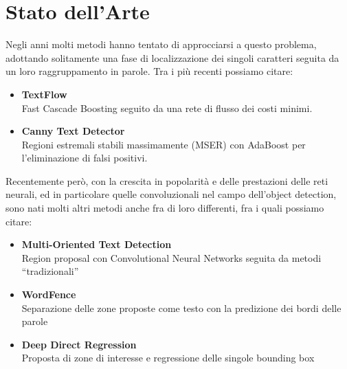 \section{Stato dell'Arte}
\label{sec:sota}
Negli anni molti metodi hanno tentato di approcciarsi a questo problema, adottando solitamente una fase di localizzazione dei singoli caratteri seguita da un loro raggruppamento in parole. Tra i più recenti possiamo citare:
\begin{itemize}
	\item
		\textbf{TextFlow}~\cite{tian2015text} \\
		Fast Cascade Boosting seguito da una rete di flusso dei costi minimi.
	\item
		\textbf{Canny Text Detector}~\cite{cho2016canny} \\
		 Regioni estremali stabili massimamente (MSER) con AdaBoost per l'eliminazione di falsi positivi.
\end{itemize}

Recentemente però, con la crescita in popolarità e delle prestazioni delle reti neurali, ed in particolare quelle convoluzionali nel campo dell'object detection, sono nati molti altri metodi anche fra di loro differenti, fra i quali possiamo citare:
\begin{itemize}
	\item \textbf{Multi-Oriented Text Detection}~\cite{zhang2016multi} \\
		Region proposal con Convolutional Neural Networks seguita da metodi ``tradizionali''
	\item \textbf{WordFence}~\cite{polzounov2017wordfence} \\
		Separazione delle zone proposte come testo con la predizione dei bordi delle parole
	\item \textbf{Deep Direct Regression}~\cite{he2017deep} \\
		Proposta di zone di interesse e regressione delle singole bounding box
\end{itemize}



